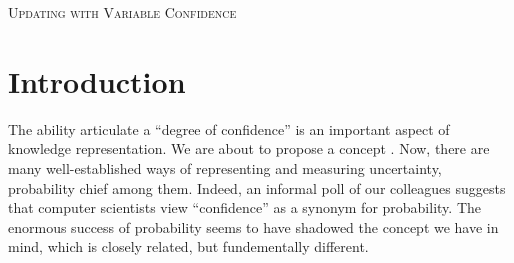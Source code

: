 \documentclass{article}
\begin{document}
\begin{center}
    \Large\scshape
    Updating with Variable Confidence
\end{center}
\bigskip

\tableofcontents



\section{Introduction}
\def\stmt{$A$}


The ability articulate a ``degree of confidence'' is an important aspect of knowledge representation.
We are about to propose a concept . 
Now, there are many well-established ways of representing and measuring uncertainty,
probability chief among them. 
Indeed, an informal poll of our colleagues suggests that computer scientists view ``confidence'' as a synonym for probability. 
The enormous success of probability seems to have shadowed the concept we have in mind, which is closely related, but fundementally different. 


\end{document}
